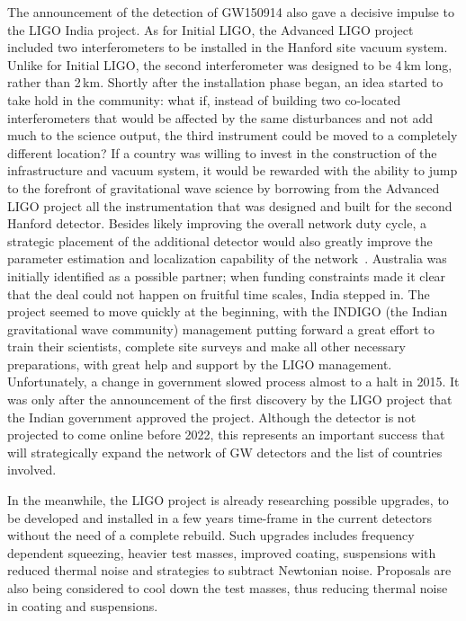 The announcement of the detection of GW150914 also gave a decisive impulse to the LIGO India project.
As for Initial LIGO, the Advanced LIGO project included two interferometers to be installed in the Hanford site vacuum system.
Unlike for Initial LIGO, the second interferometer was designed to be 4\,km long, rather than 2\,km. 
Shortly after the installation phase began, an idea started to take hold in the community: what if, instead of building two co-located interferometers that would be affected by the same disturbances and not add much to the science output, the third instrument could be moved to a completely different location? 
If a country was willing to invest in the construction of the infrastructure and vacuum system, it would be rewarded with the ability to jump to the forefront of gravitational wave science by borrowing from the Advanced LIGO project all the instrumentation that was designed and built for the second Hanford detector. 
Besides likely improving the overall network duty cycle, a strategic placement of the additional detector would also greatly improve the parameter estimation and localization capability of the network~\cite{Klimenko_2016}.
Australia was initially identified as a possible partner; when funding constraints made it clear that the deal could not happen on fruitful time scales, India stepped in.
The project seemed to move quickly at the beginning, with the INDIGO (the Indian gravitational wave community) management putting forward a great effort to train their scientists, complete site surveys and make all other necessary preparations, with great help and support by the LIGO management. 
Unfortunately, a change in government slowed process almost to a halt in 2015. 
It was only after the announcement of the first discovery by the LIGO project that the Indian government approved the project. 
Although the detector is not projected to come online before 2022, this represents an important success that will strategically expand the network of GW detectors and the list of countries involved.

In the meanwhile, the LIGO project is already researching possible upgrades, to be developed and installed in a few years time-frame in the current detectors without the need of a complete rebuild.
Such upgrades includes frequency dependent squeezing, heavier test masses, improved coating, suspensions with reduced thermal noise and strategies to subtract Newtonian noise.
Proposals are also being considered to cool down the test masses, thus reducing thermal noise in coating and suspensions. 

